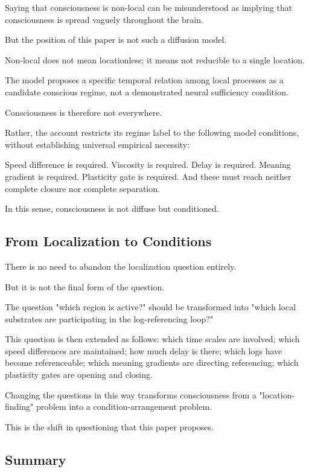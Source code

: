 Saying that consciousness is non-local can be misunderstood as implying that consciousness is spread vaguely throughout the brain.

But the position of this paper is not such a diffusion model.

Non-local does not mean locationless; it means not reducible to a single location.

The model proposes a specific temporal relation among local processes as a candidate conscious regime, not a demonstrated neural sufficiency condition.

Consciousness is therefore not everywhere.

Rather, the account restricts its regime label to the following model conditions, without establishing universal empirical necessity:

Speed difference is required. Viscosity is required. Delay is required. Meaning gradient is required. Plasticity gate is required. And these must reach neither complete closure nor complete separation.

In this sense, consciousness is not diffuse but conditioned.

\subsection{From Localization to Conditions}


There is no need to abandon the localization question entirely.

But it is not the final form of the question.

The question "which region is active?" should be transformed into "which local substrates are participating in the log-referencing loop?"

This question is then extended as follows: which time scales are involved; which speed differences are maintained; how much delay is there; which logs have become referenceable; which meaning gradients are directing referencing; which plasticity gates are opening and closing.

Changing the questions in this way transforms consciousness from a "location-finding" problem into a condition-arrangement problem.

This is the shift in questioning that this paper proposes.

\subsection{Summary}


